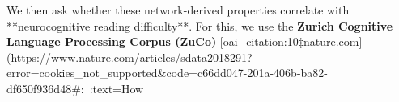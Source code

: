 We then ask whether these network-derived properties correlate with **neurocognitive reading difficulty**. For this, we use the \textbf{Zurich Cognitive Language Processing Corpus (ZuCo)} [oai_citation:10‡nature.com](https://www.nature.com/articles/sdata2018291?error=cookies_not_supported&code=c66dd047-201a-406b-ba82-df650f936d48#:~:text=How%

